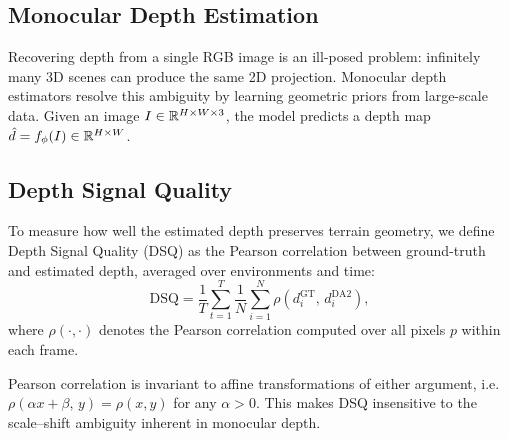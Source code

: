 \subsection{Monocular Depth Estimation}
\label{sec:depth_math}

Recovering depth from a single RGB image is an ill-posed problem:
infinitely many 3D scenes can produce the same 2D projection.
Monocular depth estimators resolve this ambiguity by learning
geometric priors from large-scale data.  Given an image
$I \in \mathbb{R}^{H \times W \times 3}$, the model predicts a depth map
$\hat{d} = f_\phi(I) \in \mathbb{R}^{H \times W}$.

\subsection{Depth Signal Quality}
\label{sec:dsq_math}

To measure how well the estimated depth preserves terrain geometry,
we define Depth Signal Quality (DSQ) as the Pearson correlation
between ground-truth and estimated depth, averaged over environments
and time:
\begin{equation}
	\mathrm{DSQ} = \frac{1}{T} \sum_{t=1}^{T}
	\frac{1}{N} \sum_{i=1}^{N}
	\rho(d^{\mathrm{GT}}_i,\, d^{\mathrm{DA2}}_i),
	\label{eq:dsq}
\end{equation}
where $\rho(\cdot,\cdot)$ denotes the Pearson correlation computed
over all pixels $p$ within each frame.

Pearson correlation is invariant to affine transformations of either
argument, i.e. $\rho(\alpha x + \beta,\, y) = \rho(x, y)$ for any
$\alpha > 0$.  This makes DSQ insensitive to the scale--shift
ambiguity inherent in monocular depth.
